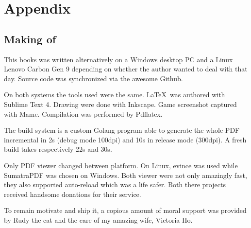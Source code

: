\chapter{Appendix} 

\section{Making of}

This books was written alternatively on a Windows desktop PC and a Linux Lenovo Carbon Gen 9 depending on whether the author wanted to deal with  that day. Source code was synchronized via the awesome Github.

On both systems the tools used were the same. \LaTeX\ was authored with Sublime Text 4. Drawing were done with Inkscape. Game screenshot captured with Mame. Compilation was performed by Pdflatex.

The build system is a custom Golang program able to generate the whole PDF incremental in 2s (debug mode 100dpi) and 10s in release mode (300dpi). A fresh build takes respectively 22s and 30s.

Only PDF viewer changed between platform. On Linux, evince was used while SumatraPDF was chosen on Windows. Both viewer were not only amazingly fast, they also supported auto-reload which was a life safer. Both there projects received handsome donations for their service.

To remain motivate and ship it, a copious amount of moral support was provided by Rudy the cat and the care of my amazing wife, Victoria Ho.
